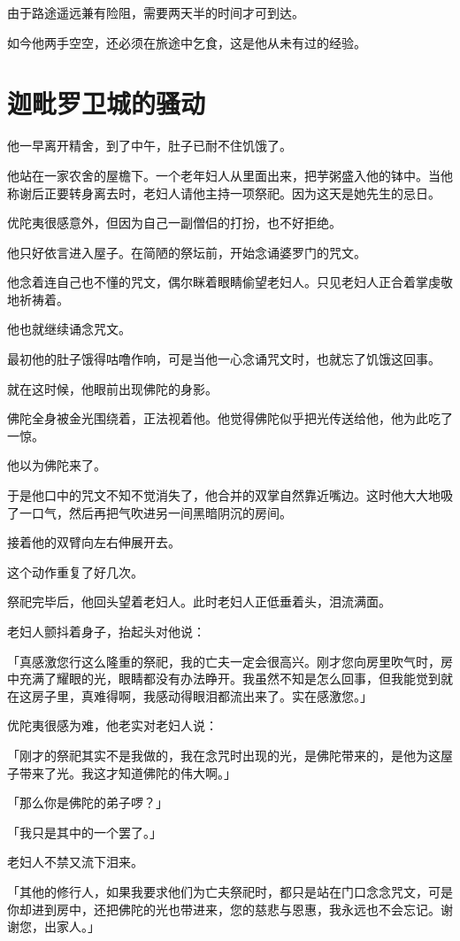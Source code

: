 \documentclass[twoside,openany]{book}
\begin{document}
由于路途遥远兼有险阻，需要两天半的时间才可到达。

如今他两手空空，还必须在旅途中乞食，这是他从未有过的经验。

\section{迦毗罗卫城的骚动}\label{sec7.5}

他一早离开精舍，到了中午，肚子已耐不住饥饿了。

他站在一家农舍的屋檐下。一个老年妇人从里面出来，把芋粥盛入他的钵中。当他称谢后正要转身离去时，老妇人请他主持一项祭祀。因为这天是她先生的忌日。

优陀夷很感意外，但因为自己一副僧侣的打扮，也不好拒绝。

他只好依言进入屋子。在简陋的祭坛前，开始念诵婆罗门的咒文。

他念着连自己也不懂的咒文，偶尔眯着眼睛偷望老妇人。只见老妇人正合着掌虔敬地祈祷着。

他也就继续诵念咒文。

最初他的肚子饿得咕噜作响，可是当他一心念诵咒文时，也就忘了饥饿这回事。

就在这时候，他眼前出现佛陀的身影。

佛陀全身被金光围绕着，正法视着他。他觉得佛陀似乎把光传送给他，他为此吃了一惊。

他以为佛陀来了。

于是他口中的咒文不知不觉消失了，他合并的双掌自然靠近嘴边。这时他大大地吸了一口气，然后再把气吹进另一间黑暗阴沉的房间。

接着他的双臂向左右伸展开去。

这个动作重复了好几次。

祭祀完毕后，他回头望着老妇人。此时老妇人正低垂着头，泪流满面。

老妇人颤抖着身子，抬起头对他说：

「真感激您行这么隆重的祭祀，我的亡夫一定会很高兴。刚才您向房里吹气时，房中充满了耀眼的光，眼睛都没有办法睁开。我虽然不知是怎么回事，但我能觉到就在这房子里，真难得啊，我感动得眼泪都流出来了。实在感激您。」

优陀夷很感为难，他老实对老妇人说：

「刚才的祭祀其实不是我做的，我在念咒时出现的光，是佛陀带来的，是他为这屋子带来了光。我这才知道佛陀的伟大啊。」

「那么你是佛陀的弟子啰？」

「我只是其中的一个罢了。」

老妇人不禁又流下泪来。

「其他的修行人，如果我要求他们为亡夫祭祀时，都只是站在门口念念咒文，可是你却进到房中，还把佛陀的光也带进来，您的慈悲与恩惠，我永远也不会忘记。谢谢您，出家人。」
\end{document}
